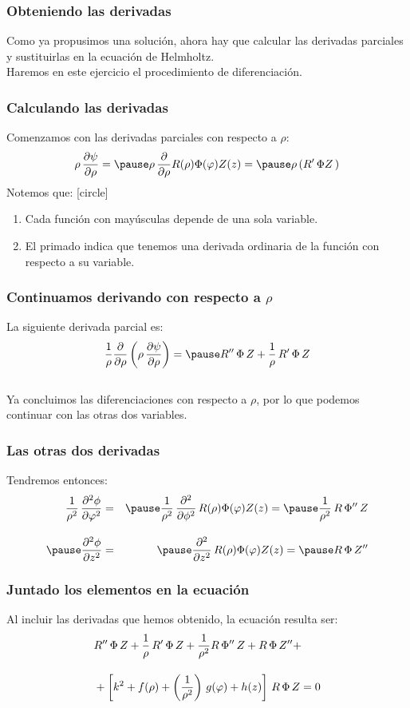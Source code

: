 \documentclass[12pt]{beamer}
\begin{document}
\begin{frame}
\frametitle{Obteniendo las derivadas}
Como ya propusimos una solución, ahora hay que calcular las derivadas parciales y sustituirlas en la ecuación de Helmholtz.
\\
\bigskip
\pause
Haremos en este ejercicio el procedimiento de diferenciación.
\end{frame}
\begin{frame}
\frametitle{Calculando las derivadas}
Comenzamos con las derivadas parciales con respecto a $\rho$:
\pause
\begin{eqnarray*}
\rho \, \pdv{\psi}{\rho} = \pause \rho \, \pdv{\rho} R(\rho) \Phi (\varphi) Z(z) = \pause \rho \left( \ptilde{R} \, \Phi Z \, \right)
\end{eqnarray*}
\pause
Notemos que:
[circle]
\begin{enumerate}[<+->]
\item Cada función con mayúsculas depende de una sola variable.
\item El primado indica que tenemos una derivada ordinaria de la función con respecto a su variable.
\end{enumerate}
\end{frame}
\begin{frame}
\frametitle{Continuamos derivando con respecto a $\rho$}
La siguiente derivada parcial es:
\begin{align*}
\dfrac{1}{\rho} \pdv{\rho} \left( \rho \, \pdv{\psi}{\rho}  \right) = \pause \stilde{R} \, \Phi \, Z + \dfrac{1}{\rho} \, \ptilde{R} \, \Phi \, Z
\end{align*}
\\
\bigskip
\pause
Ya concluimos las diferenciaciones con respecto a $\rho$, por lo que podemos continuar con las otras dos variables.
\end{frame}
\begin{frame}
\frametitle{Las otras dos derivadas}
Tendremos entonces:
\begin{eqnarray*}
\dfrac{1}{\rho^{2}} \, \pdv[2]{\phi}{\varphi} &=& \pause \dfrac{1}{\rho^{2}} \, \pdv[2]{\phi} \, R(\rho) \Phi (\varphi) Z(z) = \pause \dfrac{1}{\rho^{2}} \, R \, \stilde{\Phi} \, Z \\[1em] \pause
\pdv[2]{\phi}{z} &=& \pause \pdv[2]{z} \, R(\rho) \Phi (\varphi) Z(z) = \pause R \, \Phi \, \stilde{Z}
\end{eqnarray*}
\end{frame}
\begin{frame}
\frametitle{Juntado los elementos en la ecuación}
Al incluir las derivadas que hemos obtenido, la ecuación resulta ser:
\begin{align*}
&{} {R}^{\prime \prime} \, \Phi \, Z + \dfrac{1}{\rho} \, {R}^{\prime} \, \Phi \, Z + \dfrac{1}{\rho^{2}} R \, {\Phi}^{\prime \prime} \, Z + R \, \Phi \, {Z}^{\prime \prime} + \\[1em]
&+ \left[ k^{2} + f(\rho) + \left( \dfrac{1}{\rho^{2}} \right) \, g(\varphi) + h(z) \right] \, R \, \Phi \, Z = 0
\end{align*}
\end{frame}
\end{document}
